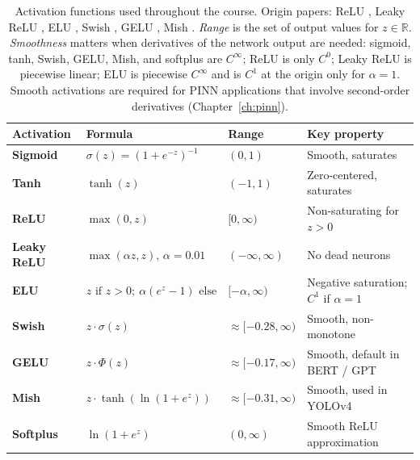 \documentclass[11pt,a4paper]{report}
\newcommand{\R}{\mathbb{R}}
\begin{document}
\begin{table}[ht]
\centering
\small
\setlength{\tabcolsep}{5pt}
\begin{tabular}{@{}>{\bfseries}l l l l@{}}
\toprule
\textbf{Activation} & \textbf{Formula} & \textbf{Range} & \textbf{Key property} \\
\midrule
Sigmoid     & $\sigma(z) = (1+e^{-z})^{-1}$              & $(0,1)$                       & Smooth, saturates           \\
Tanh        & $\tanh(z)$                                 & $(-1,1)$                      & Zero-centered, saturates     \\
ReLU        & $\max(0,z)$                                & $[0,\infty)$                  & Non-saturating for $z>0$    \\
Leaky ReLU  & $\max(\alpha z, z)$, $\alpha\!=\!0.01$     & $(-\infty,\infty)$            & No dead neurons             \\
ELU         & $z\text{ if }z>0;\ \alpha(e^z-1)\text{ else}$ & $[-\alpha,\infty)$         & Negative saturation; $C^1$ if $\alpha=1$ \\
Swish       & $z \cdot \sigma(z)$                        & $\approx [-0.28,\infty)$      & Smooth, non-monotone        \\
GELU        & $z\cdot\Phi(z)$                            & $\approx [-0.17,\infty)$      & Smooth, default in BERT / GPT \\
Mish        & $z\cdot\tanh(\ln(1+e^z))$                  & $\approx [-0.31,\infty)$      & Smooth, used in YOLOv4        \\
Softplus    & $\ln(1+e^z)$                               & $(0,\infty)$                  & Smooth ReLU approximation   \\
\bottomrule
\end{tabular}
\caption{Activation functions used throughout the course.  Origin papers: ReLU \citep{nair2010rectified}, Leaky ReLU \citep{maas2013rectifier}, ELU \citep{clevert2016elu}, Swish \citep{ramachandran2017swish}, GELU \citep{hendrycks2016gelu}, Mish \citep{misra2019mish}.  \emph{Range} is the set of output values for $z \in \R$.  \emph{Smoothness} matters when derivatives of the network output are needed: sigmoid, tanh, Swish, GELU, Mish, and softplus are $C^\infty$; ReLU is only $C^0$; Leaky ReLU is piecewise linear; ELU is piecewise $C^\infty$ and is $C^1$ at the origin only for $\alpha=1$.  Smooth activations are required for PINN applications that involve second-order derivatives (Chapter~\ref{ch:pinn}).}
\label{tab:activations}
\end{table}
\end{document}
